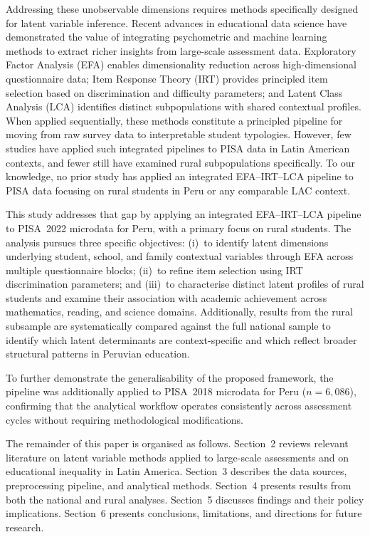 \documentclass[twocolumn,12pt]{article}
\begin{document}
Addressing these unobservable dimensions requires methods specifically
designed for latent variable inference. Recent advances in educational data
science have demonstrated the value of integrating psychometric and machine
learning methods to extract richer insights from large-scale assessment data.
Exploratory Factor Analysis (EFA) enables dimensionality reduction across
high-dimensional questionnaire data; Item Response Theory (IRT) provides
principled item selection based on discrimination and difficulty parameters;
and Latent Class Analysis (LCA) identifies distinct subpopulations with
shared contextual profiles. When applied sequentially, these methods
constitute a principled pipeline for moving from raw survey data to
interpretable student typologies. However, few studies have applied such
integrated pipelines to PISA data in Latin American contexts, and fewer still
have examined rural subpopulations specifically. To our knowledge, no prior
study has applied an integrated EFA--IRT--LCA pipeline to PISA data focusing
on rural students in Peru or any comparable LAC context.

This study addresses that gap by applying an integrated EFA--IRT--LCA
pipeline to PISA~2022 microdata for Peru, with a primary focus on rural
students. The analysis pursues three specific objectives: (i)~to identify
latent dimensions underlying student, school, and family contextual variables
through EFA across multiple questionnaire blocks; (ii)~to refine item
selection using IRT discrimination parameters; and (iii)~to characterise
distinct latent profiles of rural students and examine their association with
academic achievement across mathematics, reading, and science domains.
Additionally, results from the rural subsample are systematically compared
against the full national sample to identify which latent determinants are
context-specific and which reflect broader structural patterns in Peruvian
education.

To further demonstrate the generalisability of the proposed
framework, the pipeline was additionally applied to PISA~2018
microdata for Peru (\(n = 6{,}086\)), confirming that the
analytical workflow operates consistently across assessment
cycles without requiring methodological modifications.

The remainder of this paper is organised as follows. Section~2 reviews
relevant literature on latent variable methods applied to large-scale
assessments and on educational inequality in Latin America. Section~3
describes the data sources, preprocessing pipeline, and analytical methods.
Section~4 presents results from both the national and rural analyses.
Section~5 discusses findings and their policy implications. Section~6
presents conclusions, limitations, and directions for future research.
\end{document}
